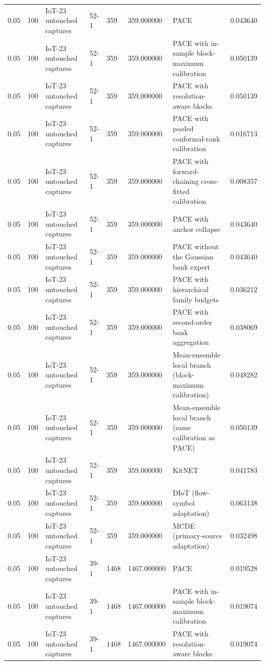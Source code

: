 \begin{tabular}{llllllll}
0.05 & 100 & IoT-23 untouched captures & 52-1 & 359 & 359.000000 & PACE & 0.043640 \\
0.05 & 100 & IoT-23 untouched captures & 52-1 & 359 & 359.000000 & PACE with in-sample block-maximum calibration & 0.050139 \\
0.05 & 100 & IoT-23 untouched captures & 52-1 & 359 & 359.000000 & PACE with resolution-aware blocks & 0.050139 \\
0.05 & 100 & IoT-23 untouched captures & 52-1 & 359 & 359.000000 & PACE with pooled conformal-rank calibration & 0.016713 \\
0.05 & 100 & IoT-23 untouched captures & 52-1 & 359 & 359.000000 & PACE with forward-chaining cross-fitted calibration & 0.008357 \\
0.05 & 100 & IoT-23 untouched captures & 52-1 & 359 & 359.000000 & PACE with anchor collapse & 0.043640 \\
0.05 & 100 & IoT-23 untouched captures & 52-1 & 359 & 359.000000 & PACE without the Gaussian bank expert & 0.043640 \\
0.05 & 100 & IoT-23 untouched captures & 52-1 & 359 & 359.000000 & PACE with hierarchical family budgets & 0.036212 \\
0.05 & 100 & IoT-23 untouched captures & 52-1 & 359 & 359.000000 & PACE with second-order bank aggregation & 0.038069 \\
0.05 & 100 & IoT-23 untouched captures & 52-1 & 359 & 359.000000 & Mean-ensemble local branch (block-maximum calibration) & 0.048282 \\
0.05 & 100 & IoT-23 untouched captures & 52-1 & 359 & 359.000000 & Mean-ensemble local branch (same calibration as PACE) & 0.050139 \\
0.05 & 100 & IoT-23 untouched captures & 52-1 & 359 & 359.000000 & KitNET & 0.041783 \\
0.05 & 100 & IoT-23 untouched captures & 52-1 & 359 & 359.000000 & DIoT (flow-symbol adaptation) & 0.063138 \\
0.05 & 100 & IoT-23 untouched captures & 52-1 & 359 & 359.000000 & MCDE (primary-source adaptation) & 0.032498 \\
0.05 & 100 & IoT-23 untouched captures & 39-1 & 1468 & 1467.000000 & PACE & 0.019528 \\
0.05 & 100 & IoT-23 untouched captures & 39-1 & 1468 & 1467.000000 & PACE with in-sample block-maximum calibration & 0.019074 \\
0.05 & 100 & IoT-23 untouched captures & 39-1 & 1468 & 1467.000000 & PACE with resolution-aware blocks & 0.019074 \\

\end{tabular}
